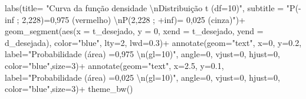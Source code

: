 \documentclass[
]{book}
\newenvironment{Shaded}{\begin{snugshade}}{\end{snugshade}}
\newcommand{\AttributeTok}[1]{\textcolor[rgb]{0.77,0.63,0.00}{#1}}
\newcommand{\DecValTok}[1]{\textcolor[rgb]{0.00,0.00,0.81}{#1}}
\newcommand{\FloatTok}[1]{\textcolor[rgb]{0.00,0.00,0.81}{#1}}
\newcommand{\FunctionTok}[1]{\textcolor[rgb]{0.00,0.00,0.00}{#1}}
\newcommand{\NormalTok}[1]{#1}
\newcommand{\SpecialCharTok}[1]{\textcolor[rgb]{0.00,0.00,0.00}{#1}}
\newcommand{\StringTok}[1]{\textcolor[rgb]{0.31,0.60,0.02}{#1}}
\begin{document}
\begin{Shaded}
\begin{Highlighting}[]
  \FunctionTok{labs}\NormalTok{(}\AttributeTok{title=} \StringTok{"Curva da função densidade }\SpecialCharTok{\textbackslash{}n}\StringTok{Distribuição t (df=10)"}\NormalTok{, }
       \AttributeTok{subtitle =} \StringTok{"P({-}inf ; 2,228)=0,975 (vermelho) }\SpecialCharTok{\textbackslash{}n}\StringTok{P(2,228 ; +inf)= 0,025 (cinza)"}\NormalTok{)}\SpecialCharTok{+}
  \FunctionTok{geom\_segment}\NormalTok{(}\FunctionTok{aes}\NormalTok{(}\AttributeTok{x =}\NormalTok{ t\_desejado, }\AttributeTok{y =} \DecValTok{0}\NormalTok{, }\AttributeTok{xend =}\NormalTok{ t\_desejado, }\AttributeTok{yend =}\NormalTok{ d\_desejada), }\AttributeTok{color=}\StringTok{"blue"}\NormalTok{, }\AttributeTok{lty=}\DecValTok{2}\NormalTok{, }\AttributeTok{lwd=}\FloatTok{0.3}\NormalTok{)}\SpecialCharTok{+}
  \FunctionTok{annotate}\NormalTok{(}\AttributeTok{geom=}\StringTok{"text"}\NormalTok{, }\AttributeTok{x=}\DecValTok{0}\NormalTok{, }\AttributeTok{y=}\FloatTok{0.2}\NormalTok{, }\AttributeTok{label=}\StringTok{"Probabilidade (área) =0,975 }\SpecialCharTok{\textbackslash{}n}\StringTok{(gl=10)"}\NormalTok{, }\AttributeTok{angle=}\DecValTok{0}\NormalTok{, }\AttributeTok{vjust=}\DecValTok{0}\NormalTok{, }\AttributeTok{hjust=}\DecValTok{0}\NormalTok{, }\AttributeTok{color=}\StringTok{"blue"}\NormalTok{,}\AttributeTok{size=}\DecValTok{3}\NormalTok{)}\SpecialCharTok{+}
  \FunctionTok{annotate}\NormalTok{(}\AttributeTok{geom=}\StringTok{"text"}\NormalTok{, }\AttributeTok{x=}\FloatTok{2.5}\NormalTok{, }\AttributeTok{y=}\FloatTok{0.1}\NormalTok{, }\AttributeTok{label=}\StringTok{"Probabilidade (área) =0,025 }\SpecialCharTok{\textbackslash{}n}\StringTok{(gl=10)"}\NormalTok{, }\AttributeTok{angle=}\DecValTok{0}\NormalTok{, }\AttributeTok{vjust=}\DecValTok{0}\NormalTok{, }\AttributeTok{hjust=}\DecValTok{0}\NormalTok{, }\AttributeTok{color=}\StringTok{"blue"}\NormalTok{,}\AttributeTok{size=}\DecValTok{3}\NormalTok{)}\SpecialCharTok{+}
  \FunctionTok{theme\_bw}\NormalTok{()}
\end{Highlighting}
\end{Shaded}
\end{document}
